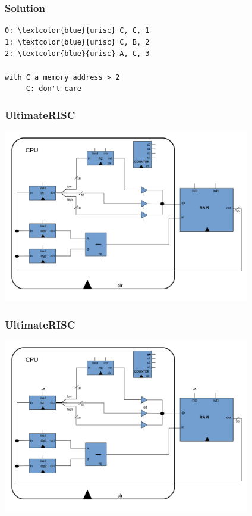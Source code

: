 \documentclass{beamer}
\begin{document}
\ifanswers

\begin{frame}[fragile]
\frametitle{Solution}

\begin{Verbatim}[commandchars=\\\{\}]
0: \textcolor{blue}{urisc} C, C, 1
1: \textcolor{blue}{urisc} C, B, 2
2: \textcolor{blue}{urisc} A, C, 3

with C a memory address > 2
     C: don't care
\end{Verbatim}

\end{frame}

\fi

\begin{frame}%
\frametitle{UltimateRISC}

\vspace{-0.2cm}

\begin{center}
\includegraphics[width=10.8cm]{urisc.pdf}
\end{center}

\end{frame}

\begin{frame}%
\frametitle{UltimateRISC}

\vspace{-0.2cm}

\begin{center}
\includegraphics[width=10.8cm]{urisc1.pdf}
\end{center}

\end{frame}
\end{document}
